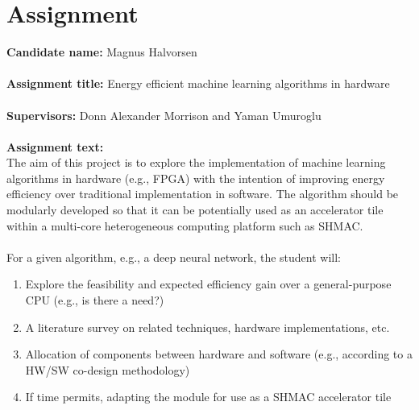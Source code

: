 \section*{Assignment}

\textbf{Candidate name:} Magnus Halvorsen \\ \hfil \\ \hfil
\textbf{Assignment title:} Energy efficient machine learning algorithms in hardware \\ \hfil \\ \hfil
\textbf{Supervisors:} Donn Alexander Morrison and Yaman Umuroglu \\ \hfil \\ \hfil
\textbf{Assignment text:} \\ \hfil
The aim of this project is to explore the implementation of machine learning algorithms in hardware (e.g., FPGA) with the intention of improving energy efficiency over traditional implementation in software. The algorithm should be modularly developed so that it can be potentially used as an accelerator tile within a multi-core heterogeneous computing platform such as SHMAC. \\ \hfil \\ \hfil
For a given algorithm, e.g., a deep neural network, the student will:

\begin{enumerate}
	
	\item Explore the feasibility and expected efficiency gain over a general-purpose CPU (e.g., is there a need?)
	
	\item A literature survey on related techniques, hardware implementations, etc.
	
	\item Allocation of components between hardware and software (e.g., according to a HW/SW co-design methodology)
	
	\item If time permits, adapting the module for use as a SHMAC accelerator tile
	
\end{enumerate}